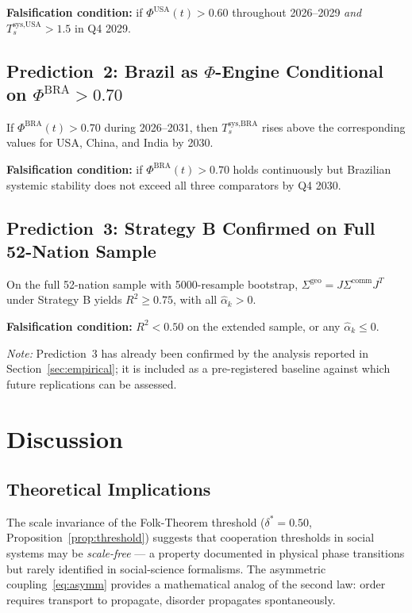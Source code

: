\documentclass[12pt]{article}
\theoremstyle{plain}
\theoremstyle{definition}
\theoremstyle{remark}
\begin{document}
\textbf{Falsification condition:} if $\Phi^{\text{USA}}(t) > 0.60$ throughout 2026--2029 \emph{and} $T_s^{\text{sys},\text{USA}} > 1.5$ in Q4 2029.

\subsection{Prediction~2: Brazil as $\Phi$-Engine Conditional on $\Phi^{\text{BRA}} > 0.70$}

If $\Phi^{\text{BRA}}(t) > 0.70$ during 2026--2031, then $T_s^{\text{sys},\text{BRA}}$ rises above the corresponding values for USA, China, and India by 2030.

\textbf{Falsification condition:} if $\Phi^{\text{BRA}}(t) > 0.70$ holds continuously but Brazilian systemic stability does not exceed all three comparators by Q4 2030.

\subsection{Prediction~3: Strategy B Confirmed on Full 52-Nation Sample}

On the full 52-nation sample with 5000-resample bootstrap, $\Sigma^{\text{geo}} = J \Sigma^{\text{comm}} J^T$ under Strategy B yields $R^2 \geq 0.75$, with all $\hat\alpha_k > 0$.

\textbf{Falsification condition:} $R^2 < 0.50$ on the extended sample, or any $\hat\alpha_k \leq 0$.

\textit{Note:} Prediction~3 has already been confirmed by the analysis reported in Section~\ref{sec:empirical}; it is included as a pre-registered baseline against which future replications can be assessed.

\section{Discussion}

\subsection{Theoretical Implications}

The scale invariance of the Folk-Theorem threshold ($\delta^* = 0.50$, Proposition~\ref{prop:threshold}) suggests that cooperation thresholds in social systems may be \emph{scale-free} --- a property documented in physical phase transitions \citep{barabasi1999} but rarely identified in social-science formalisms. The asymmetric coupling~\eqref{eq:asymm} provides a mathematical analog of the second law: order requires transport to propagate, disorder propagates spontaneously.
\end{document}
